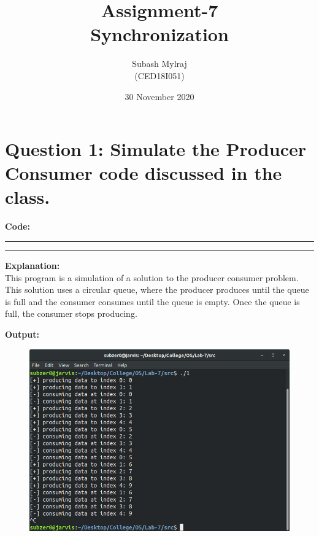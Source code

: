 \documentclass{article}
\title{Assignment-7\\Synchronization}
\author{Subash Mylraj \\(CED18I051) }
\date{30 November 2020}
\begin{document}
\maketitle



\section*{Question 1: Simulate the Producer Consumer code discussed in the class.}
\bigskip

\par\noindent
\textbf{\Large Code: }
\smallskip
\par\noindent\rule{\textwidth}{0.4pt}

\par\noindent\rule{\textwidth}{0.4pt}

\bigskip
\noindent
\textbf{\Large Explanation: } \\

This program is a simulation of a solution to the producer consumer problem.
This solution uses a circular queue, where the producer produces until the queue
is full and the consumer consumes until the queue is empty. Once the queue is full, 
the consumer stops producing.

\bigskip
\noindent
\textbf{\Large Output:}

\begin{figure}[h]
	\includegraphics[width=\textwidth]{output/1.png}
\end{figure}
\bigskip
\end{document}

